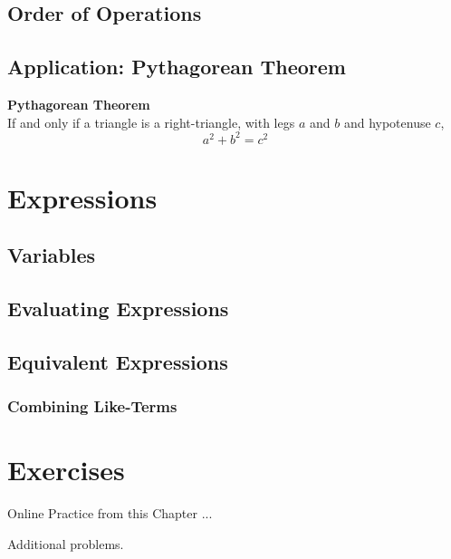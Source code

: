 \newpage 
\subsection{Order of Operations}


\newpage 
\subsection{Application: Pythagorean Theorem} 

\begin{theorem} \textbf{Pythagorean Theorem} \\ 
If and only if a triangle is a right-triangle, with legs \(a\) and \(b\) and hypotenuse \(c\),
\[a^2 + b^2 = c^2\]
\end{theorem}


\newpage 
\section{Expressions}

\subsection{Variables}
\subsection{Evaluating Expressions}
\subsection{Equivalent Expressions}
\subsubsection{Combining Like-Terms}

\newpage 
\section{Exercises} 

Online Practice from this Chapter ... 

Additional problems. 















